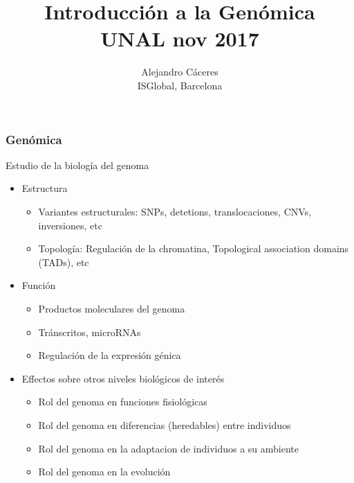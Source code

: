 \documentclass{beamer}\usepackage[]{graphicx}\usepackage[]{color}
\begin{document}

\title{Introducci\'on a la Gen\'omica \\ UNAL nov 2017}
\author{Alejandro C\'aceres \\ ISGlobal, Barcelona}
\date{}

\maketitle


\begin{frame}[fragile]
\frametitle{Gen\'omica}

Estudio de la biolog\'ia del genoma
\begin{itemize}
\item Estructura
   \begin{itemize}
     \item Variantes estructurales: SNPs, detetions, translocaciones, CNVs, inversiones, etc
     \item Topología: Regulaci\'on de la chromatina, Topological association domains (TADs), etc
   \end{itemize}
\item Funci\'on
   \begin{itemize}
      \item Productos moleculares del genoma
      \item Tránscritos, microRNAs
      \item Regulaci\'on de la expresi\'on g\'enica
   \end{itemize}
\item Effectos sobre otros niveles biol\'ogicos de inter\'es
   \begin{itemize}
     \item Rol del genoma en funciones fisiol\'ogicas
     \item Rol del genoma en diferencias (heredables) entre individuos 
     \item Rol del genoma en la adaptacion de individuos a su ambiente
     \item Rol del genoma en la evoluci\'on
   \end{itemize}
\end{itemize}
\end{frame}
\end{document}

